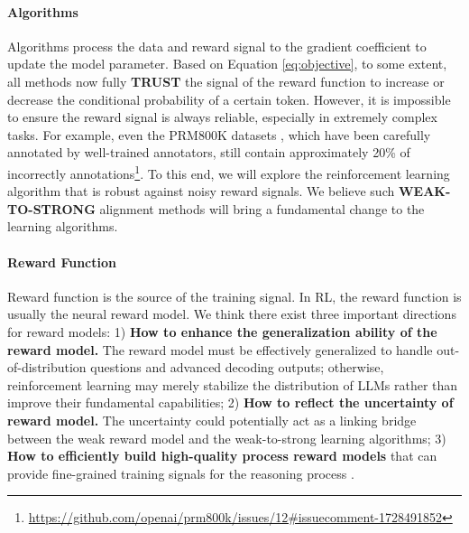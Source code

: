 \paragraph{Algorithms} Algorithms process the data and reward signal to the gradient coefficient to update the model parameter. Based on Equation \ref{eq:objective}, to some extent, all methods now fully \textbf{TRUST} the signal of the reward function to increase or decrease the conditional probability of a certain token. However, it is impossible to ensure the reward signal is always reliable, especially in extremely complex tasks. For example, even the PRM800K datasets \citep{lightman2023let}, which have been carefully annotated by well-trained annotators, still contain approximately 20\% of incorrectly annotations\footnote{\url{https://github.com/openai/prm800k/issues/12\#issuecomment-1728491852}}. To this end, we will explore the reinforcement learning algorithm that is robust against noisy reward signals.  We believe such \textbf{WEAK-TO-STRONG} \citep{burns2023weak} alignment methods will bring a fundamental change to the learning algorithms.

\paragraph{Reward Function} Reward function is the source of the training signal. In RL, the reward function is usually the neural reward model. We think there exist three important directions for reward models: 1) \textbf{How to enhance the generalization ability of the reward model.} The reward model must be effectively generalized to handle out-of-distribution questions and advanced decoding outputs; otherwise, reinforcement learning may merely stabilize the distribution of LLMs rather than improve their fundamental capabilities; 2) \textbf{How to reflect the uncertainty of reward model.} The uncertainty could potentially act as a linking bridge between the weak reward model and the weak-to-strong learning algorithms; 3) \textbf{How to efficiently build high-quality process reward models} that can provide fine-grained training signals for the reasoning process \citep{lightman2023let,wang2023math}.

